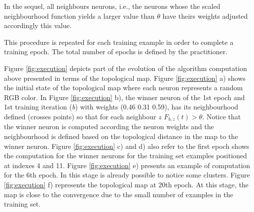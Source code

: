 \vspace{0.2cm}

In the sequel, all neighbours neurons, i.e., the neurons whose the scaled neighbourhood function yields a larger value than $\theta$ have theirs weights adjusted accordingly this value. 

This procedure is repeated for each training example in order to complete a training epoch. The total number of epochs is defined by the practitioner. 

Figure \ref{fig:execution} depicts part of the evolution of the algorithm computation above presented in terms of the topological map. Figure \ref{fig:execution} a) shows the initial state of the topological map where each neuron represents a random RGB color. In Figure \ref{fig:execution} b), the winner neuron of the 1st epoch and 1st training iteration (\textit{b}) with weights (0.46 0.31 0.59), has its neighbourhood defined (crosses points) so that for each neighbour $z$ $F_{b,z}(t) > \theta$. Notice that the winner neuron is computed according the neuron weights and the neighbourhood is defined based on the topological distance in the map to the winner neuron. Figure \ref{fig:execution} c) and d) also refer to the first epoch shows the computation for the winner neurons for the training set examples positioned at indexes 4 and 11. Figure \ref{fig:execution} e) presents an example of computation for the 6th epoch. In this stage is already possible to notice some clusters. Figure \ref{fig:execution} f) represents the topological map at 20th epoch. At this stage, the map is close to the convergence due to the small number of examples in the training set.


